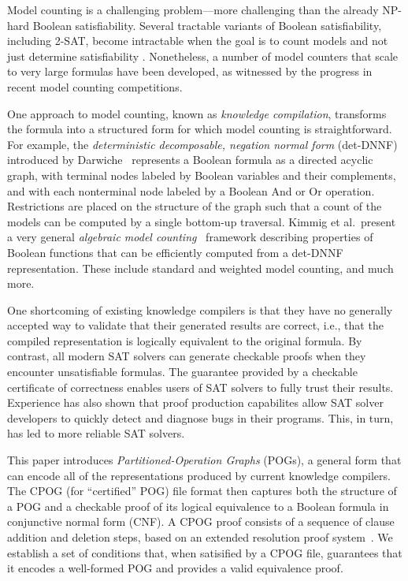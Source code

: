 \documentclass[letterpaper,USenglish,cleveref, autoref, thm-restate]{lipics-v2021}
\begin{document}
Model counting is a challenging problem---more challenging than the
already NP-hard Boolean satisfiability.  Several
tractable variants of Boolean satisfiability, including 2-SAT, become
intractable when the goal is to count models and not just determine
satisfiability \cite{valiant:siam:1979}.  Nonetheless, a number of
model counters that scale to very large formulas have been developed, as
witnessed by the progress in recent model counting competitions.

One approach to model counting, known as \emph{knowledge compilation},
transforms the formula into a structured form for which model counting
is straightforward.  For example, the \emph{deterministic
decomposable, negation normal form}
(det-DNNF) introduced by
Darwiche~\cite{darwiche:aaai:2002,darwiche:ecai:2004}
represents a
Boolean formula as a directed acyclic graph, with terminal nodes
labeled by Boolean variables and their complements, and with each
nonterminal node labeled by a Boolean And or Or operation.  Restrictions
are placed on the structure of the graph such that a count of the
models can be computed by a single bottom-up traversal.
Kimmig et al.\ present a very general {\em
  algebraic model counting}~\cite{kimmig:jal:2017} framework describing
properties of Boolean functions that can be efficiently computed from
a det-DNNF representation.  These include standard and weighted model
counting, and much more.

One shortcoming of existing knowledge compilers is that they have no
generally accepted
way to validate that their generated results are correct, i.e., that
the compiled representation is logically equivalent to the original
formula.  By contrast, all modern SAT solvers can generate
checkable proofs when they encounter unsatisfiable formulas.  The
guarantee provided by a checkable certificate of correctness enables
users of SAT solvers to fully trust their results.  Experience has also
shown that proof production capabilites allow SAT solver developers to quickly
detect and diagnose bugs in their programs. This, in turn, has led
to more reliable SAT solvers.

This paper introduces \emph{Partitioned-Operation Graphs} (POGs),
a general form that can encode all of the representations produced by current knowledge
compilers. The CPOG (for ``certified'' POG) file format then
captures both the structure of a POG
and a checkable proof of its logical equivalence to a Boolean formula in
conjunctive normal form (CNF).  A CPOG
proof consists of a sequence of clause addition and deletion steps,
based on an extended resolution proof system~\cite{Tseitin:1983}.
We establish a set of conditions that, when satisified by a CPOG file, guarantees that it
encodes a well-formed POG and provides a valid equivalence proof.
\end{document}
